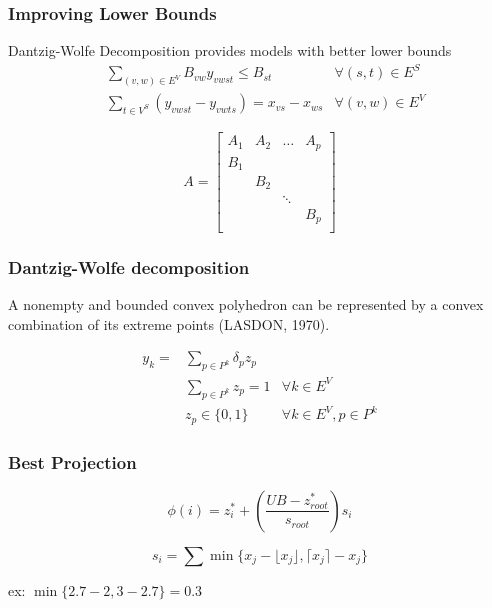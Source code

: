 \documentclass[english]{beamer}
\begin{document}
\begin{frame}
\frametitle{Improving Lower Bounds}
Dantzig-Wolfe Decomposition provides models with better lower bounds
\pause
\begin{align}
  & \sum\limits_{(v,w) \in E^{V}} B_{vw}  y_{vwst} \leq B_{st}                 & \forall (s,t) \in E^{S} \nonumber \\
  & \sum\limits_{t \in V^{S}} ( y_{vwst} - y_{vwts}) = x_{vs} - x_{ws} & \forall (v,w) \in E^{V} \nonumber  
\end{align}

\begin{equation}
A = \left[  \begin{array}{cccc}
            A_{1} & A_{2} & \ldots & A_{p} \\
            B_{1} &       &        &       \\
                  & B_{2} &        &       \\
                  &       & \ddots &       \\
                  &       &        & B_{p} \\
            \end{array} \right] \nonumber
\end{equation}
\end{frame}
\begin{frame}
  \frametitle{Dantzig-Wolfe decomposition}
A nonempty and bounded convex polyhedron can be represented by a convex combination of its extreme points (LASDON, 1970).

\begin{align}
  y_{k} = & \sum\limits_{p \in P^{k}} \delta_{p} z_{p} \nonumber & \\
          & \sum\limits_{p \in P^k} z_{p} = 1 & \forall k \in E^V \nonumber \\
          & z_{p} \in \{0,1\}                       & \forall k \in E^V, p \in P^k \nonumber
\end{align}
\end{frame}
\begin{frame}
  \frametitle{Best Projection}
  \begin{equation}
    \phi(i) = z_{i}^* + (\frac{UB - z_{root}^*}{s_{root}}) s_{i}   \nonumber
  \end{equation}

  \begin{equation}
    s_{i} = \sum \min \{ x_{j} - \lfloor x_{j} \rfloor, \lceil x_{j} \rceil - x_{j} \} \nonumber
  \end{equation}

  ex: $\min\{2.7 - 2, 3 - 2.7\} = 0.3$

\end{frame}

\end{document}
